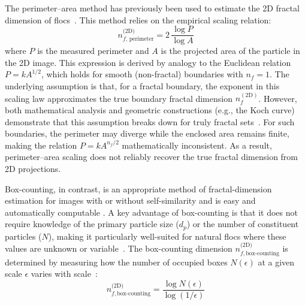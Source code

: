 \documentclass{agujournal2019}
\begin{document}
The perimeter--area method has previously been used to estimate the 2D fractal dimension of flocs~\cite{lee2004prediction, maggi2004method, tang2015reconstructing}. This method relies on the empirical scaling relation:
\begin{equation}
n_{f,\,\text{perimeter}}^{\text{(2D)}} = 2\,\frac{\log P}{\log A}
\end{equation}
where $P$ is the measured perimeter and $A$ is the projected area of the particle in the 2D image. This expression is derived by analogy to the Euclidean relation $P = k A^{1/2}$, which holds for smooth (non-fractal) boundaries with $n_f = 1$. The underlying assumption is that, for a fractal boundary, the exponent in this scaling law approximates the true boundary fractal dimension $n_f^{(2\mathrm{D})}$. However, both mathematical analysis and geometric constructions (e.g., the Koch curve) demonstrate that this assumption breaks down for truly fractal sets~\cite{cheng1995perimeter,frame_mandelbrot_neger_2025}. For such boundaries, the perimeter may diverge while the enclosed area remains finite, making the relation $P = k A^{n_f/2}$ mathematically inconsistent. As a result, perimeter–area scaling does not reliably recover the true fractal dimension from 2D projections.

Box-counting, in contrast, is an appropriate method of fractal-dimension estimation for images with or without self-similarity and is easy and automatically computable \cite{foroutan1999advances}. A key advantage of box-counting is that it does not require knowledge of the primary particle size ($d_p$) or the number of constituent particles ($N$), making it particularly well-suited for natural flocs where these values are unknown or variable~\cite{bellouti1997flocs, spencer2022quantification}. The box-counting dimension $n_{f,\text{box-counting}}^{\text{(2D)}}$ is determined by measuring how the number of occupied boxes $N(\epsilon)$ at a given scale $\epsilon$ varies with scale~\cite{mandelbrot1967long}:
\begin{equation}
n_{f,\text{box-counting}}^{\text{(2D)}} = \frac{\log N(\epsilon)}{\log(1/\epsilon)}
\end{equation}
\end{document}
